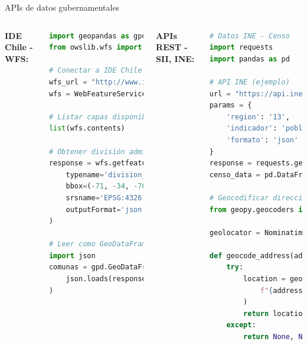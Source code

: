 \documentclass[10pt,aspectratio=169]{beamer}
\begin{document}
\begin{frame}[fragile]{APIs de datos gubernamentales}
    \begin{columns}[T]
        \textbf{IDE Chile - WFS:}
        \begin{lstlisting}[language=Python]
import geopandas as gpd
from owslib.wfs import WebFeatureService

# Conectar a IDE Chile
wfs_url = "http://www.ide.cl/geoserver/wfs"
wfs = WebFeatureService(url=wfs_url, version='2.0.0')

# Listar capas disponibles
list(wfs.contents)

# Obtener división administrativa
response = wfs.getfeature(
    typename='division_politica:comunas',
    bbox=(-71, -34, -70, -33),  # RM
    srsname='EPSG:4326',
    outputFormat='json'
)

# Leer como GeoDataFrame
import json
comunas = gpd.GeoDataFrame.from_features(
    json.loads(response.read())
)
        \end{lstlisting}
        
        \textbf{APIs REST - SII, INE:}
        \begin{lstlisting}[language=Python]
# Datos INE - Censo
import requests
import pandas as pd

# API INE (ejemplo)
url = "https://api.ine.cl/datos/censo2017"
params = {
    'region': '13',
    'indicador': 'poblacion',
    'formato': 'json'
}
response = requests.get(url, params=params)
censo_data = pd.DataFrame(response.json())

# Geocodificar direcciones SII
from geopy.geocoders import Nominatim

geolocator = Nominatim(user_agent="my_app")

def geocode_address(address):
    try:
        location = geolocator.geocode(
            f"{address}, Santiago, Chile"
        )
        return location.latitude, location.longitude
    except:
        return None, None
        \end{lstlisting}
    \end{columns}
\end{frame}
\end{document}
